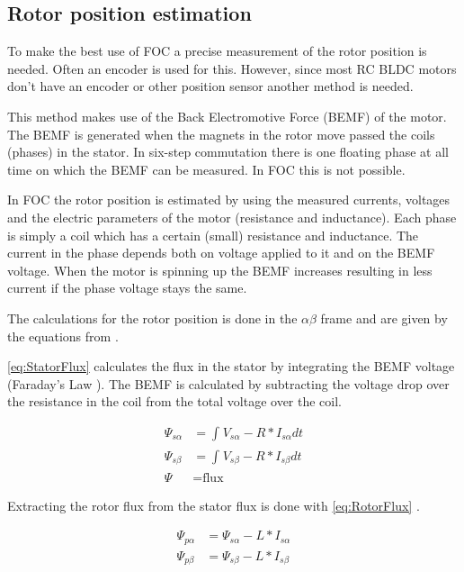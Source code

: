 \documentclass[]{report}
\begin{document}
\label{seq:RotorPositionEstimationIntegration}
\subsection{Rotor position estimation}
To make the best use of FOC a precise measurement of the rotor position is needed. Often an encoder is used for this. However, since most RC BLDC motors don't have an encoder or other position sensor another method is needed.

This method makes use of the Back Electromotive Force (BEMF) of the motor. The BEMF is generated when the magnets in the rotor move passed the coils (phases) in the stator. In six-step commutation there is one floating phase at all time on which the BEMF can be measured. In FOC this is not possible.

In FOC the rotor position is estimated by using the measured currents, voltages and the electric parameters of the motor (resistance and inductance). Each phase is simply a coil which has a certain (small) resistance and inductance. The current in the phase depends both on voltage applied to it and on the BEMF voltage. When the motor is spinning up the BEMF increases resulting in less current if the phase voltage stays the same.

The calculations for the rotor position is done in the $\alpha\beta$ frame and are given by the equations from \cite{Infineon_sensorless_FOC}.

\autoref{eq:StatorFlux} calculates the flux in the stator by integrating the BEMF voltage (Faraday's Law \cite{Faradays_Law_concepts}). The BEMF is calculated by subtracting the voltage drop over the resistance in the coil from the total voltage over the coil.

\begin{equation} \label{eq:StatorFlux}
\begin{split}
	\Psi_{s\alpha} &= \int_{}^{} V_{s\alpha} - R*I_{s\alpha} dt \\
	\Psi_{s\beta} &= \int_{}^{} V_{s\beta} - R*I_{s\beta} dt \\
	\Psi &= \text{flux}
\end{split}
\end{equation}

Extracting the rotor flux from the stator flux is done with \autoref{eq:RotorFlux} \cite{Infineon_sensorless_FOC}.

\begin{equation} \label{eq:RotorFlux}
	\begin{split}
		\Psi_{p\alpha} &= \Psi_{s\alpha} - L*I_{s\alpha} \\
		\Psi_{p\beta} &= \Psi_{s\beta} - L*I_{s\beta}
	\end{split}
\end{equation}
\end{document}

